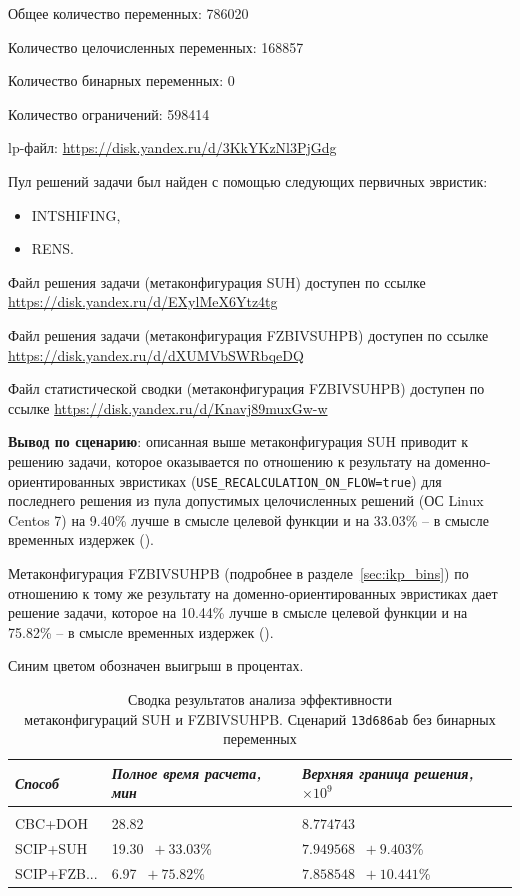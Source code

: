 \documentclass[%
	11pt,
	a4paper,
	utf8,
		]{article}
\begin{document}
Общее количество переменных: 786020

Количество целочисленных переменных: 168857

Количество бинарных переменных: 0

Количество ограничений: 598414

lp-файл: \url{https://disk.yandex.ru/d/3KkYKzNl3PjGdg}

Пул решений задачи был найден с помощью следующих первичных эвристик:
\begin{itemize}
	\item INTSHIFING,
	
	\item RENS.
\end{itemize}

Файл решения задачи (метаконфигурация SUH) доступен по ссылке \url{https://disk.yandex.ru/d/EXylMeX6Ytz4tg}

Файл решения задачи (метаконфигурация FZBIVSUHPB) доступен по ссылке \url{https://disk.yandex.ru/d/dXUMVbSWRbqeDQ}

Файл статистической сводки (метаконфигурация FZBIVSUHPB) доступен по ссылке \url{https://disk.yandex.ru/d/Knavj89muxGw-w}

\vspace*{3mm}
\textbf{Вывод по сценарию}: описанная выше метаконфигурация SUH приводит к решению задачи, которое оказывается по отношению к результату на доменно-ориентированных эвристиках (\verb|USE_RECALCULATION_ON_FLOW=true|) для последнего решения из пула допустимых целочисленных решений (ОС Linux Centos 7) на 9.40\% лучше в смысле целевой функции и на 33.03\% -- в смысле временных издержек ().

Метаконфигурация FZBIVSUHPB (подробнее в разделе~\ref{sec:ikp_bins}) по отношению к тому же результату на доменно-ориентированных эвристиках дает решение задачи, которое на 10.44\% лучше в смысле целевой функции и на  75.82\% -- в смысле временных издержек ().

Синим цветом обозначен выигрыш в процентах.

{
	\begin{table}[!h]
		\centering
		\caption{Сводка результатов анализа эффективности \\метаконфигураций SUH и FZBIVSUHPB. Сценарий \texttt{13d686ab} без бинарных переменных}
		\begin{tabular}{ p{2.5cm} p{3.3cm} p{3.4cm} }
			\emph{Способ} & \emph{Полное время расчета, мин} & \emph{Верхняя граница решения, $ \times 10^{9} $} \\
			\hline\hline\\[-3.5mm]
			{CBC+DOH} & 28.82 & $ 8.774743 $ \\
			\hline
			SCIP+SUH & 19.30 {\color{blue} $\ +33.03 $\%} & $ 7.949568 $ {\color{blue} $\ +9.403 $\%} \\
			\hline
			SCIP+FZB... & 6.97 {\color{blue} $\ +75.82 $\%} & $ 7.858548 $ {\color{blue} $\ +10.441 $\%} \\
		\end{tabular}\label{tab:13d686ab_wo_bins}
	\end{table}
}
\end{document}
